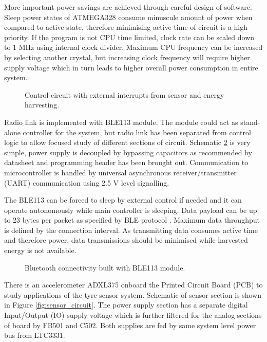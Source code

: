 More important power savings are achieved through careful design of software. Sleep power states of ATMEGA328 consume minuscule amount of power when compared to active state, therefore minimising active time of circuit is a high priority. If the program is not CPU time limited, clock rate can be scaled down to 1 MHz using internal clock divider. Maximum CPU frequency can be increased by selecting another crystal, but increasing clock frequency will require higher supply voltage which in turn leads to higher overall power consumption in entire system.

\begin{figure}[htb]
    \centering
    \def\svgwidth{\columnwidth}
    
    \caption{\label{fig:atmega_circuit} Control circuit with external interrupts from sensor and energy harvesting.}
\end{figure}

Radio link is implemented with BLE113 module. The module could act as stand-alone controller for the system, but radio link has been separated from control logic to allow focused study of different sections of circuit.  Schematic  \ref{fig:bluetooth_circuit} is very simple, power supply is decoupled by bypassing capacitors as recommended by datasheet and programming header has been brought out. Communication to microcontroller is handled by universal asynchronous receiver/transmitter (UART) communication using 2.5 V level signalling. 

The BLE113 can be forced to sleep by external control if needed and it can operate autonomously while main controller is sleeping. Data payload can be up to 23 bytes per packet as specified by BLE protocol \cite{Gomez2012}. Maximum data throughput is defined by the connection interval. As transmitting data consumes active time and therefore power, data transmissions should be minimised while harvested energy is not available.

\begin{figure}[htb]
    \centering
    \def\svgwidth{\columnwidth}
    
    \caption{\label{fig:bluetooth_circuit} Bluetooth connectivity built with BLE113 module.}
\end{figure}

There is an accelerometer ADXL375 onboard the Printed Circuit Board (PCB) to study applications of the tyre sensor system. Schematic of sensor section is shown in Figure \ref{fig:sensor_circuit}. The power supply section has a separate digital Input/Output (IO) supply voltage which is further filtered for the analog sections of board by FB501 and C502. Both supplies are fed by same system level power bus from LTC3331.

